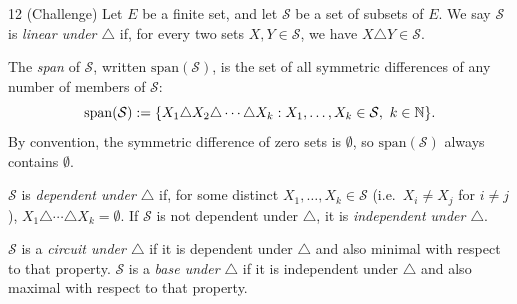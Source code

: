 \documentclass[11pt]{article}
\begin{document}
\begin{exercise}{12}
    (Challenge) Let $E$ be a finite set, and let $\mathcal{S}$ be a
    set of subsets of $E$. We say $\mathcal{S}$ is \emph{linear under
    $\triangle$} if, for every two sets $X, Y \in \mathcal{S}$, we
    have $X \triangle Y \in \mathcal{S}$.

    The \emph{span} of $\mathcal{S}$, written $\mathrm{span}(\mathcal{S})$,
    is the set of all symmetric differences of any number of members
    of $\mathcal{S}$:
    \[
        \mathrm{span}(\mathcal{S}) := \{X_1 \triangle X_2 \triangle
        \cdots \triangle X_k : X_1,\dots,X_k \in \mathcal{S},\ k \in
        \mathbb{N}\}.
    \]
    By convention, the symmetric difference of zero sets is
    $\emptyset$, so $\mathrm{span}(\mathcal{S})$ always contains
    $\emptyset$.

    $\mathcal{S}$ is \emph{dependent under $\triangle$} if, for some
    distinct $X_1,\dots,X_k \in \mathcal{S}$ (i.e.\ $X_i \ne X_j$ for
    $i \ne j$), $X_1 \triangle \cdots \triangle X_k = \emptyset$. If
    $\mathcal{S}$ is not dependent under $\triangle$, it is
    \emph{independent under $\triangle$}.

    $\mathcal{S}$ is a \emph{circuit under $\triangle$} if it is
    dependent under $\triangle$ and also minimal with respect to that
    property. $\mathcal{S}$ is a \emph{base under $\triangle$} if it
    is independent under $\triangle$ and also maximal with respect to
    that property.


\end{exercise}
\end{document}
